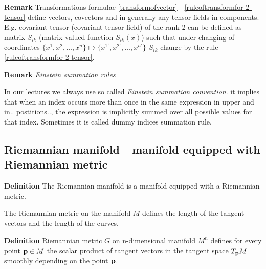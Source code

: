 \documentclass[12pt]{article}
\theoremstyle{theorem}
\numberwithin{equation}{section}
\begin{document}
{\bf Remark} Transformations formulae \eqref{transformofvector}---\eqref{ruleoftransformfor 2-tensor}  define
vectors, covectors and in generally any tensor fields in components. E.g. covariant tensor (covariant tensor field)
of the rank 2 can be defined as matrix $S_{ik}$ (matrix valued function $S_{ik}(x)$) such that
under changing of coordinates $\{x^1,x^2,\dots,x^n\}\mapsto \{x^{1'},x^{2'},\dots,x^{n'}\}$
 $S_{ik}$ change by the rule \eqref{ruleoftransformfor 2-tensor}.


{\bf Remark} {\it Einstein summation rules}


 In our lectures we always use so called {\it Einstein summation convention}.
 it  implies that when an index occurs more than once in the same expression in upper and in.. postitions..,
 the expression is implicitly summed over all possible values for that index.
  Sometimes it is called dummy indices summation rule.


    \subsection {Riemannian manifold---manifold equipped with Riemannian metric}

{\bf Definition} The Riemannian manifold is a manifold equipped with a Riemannian metric.




  The Riemannian metric on the manifold $M$ defines the
  length of the tangent vectors and the length of the curves.

{\bf Definition}
  Riemannian metric $G$ on n-dimensional manifold $M^n$
  defines for every point ${\bf p}\in M$ the scalar product
  of tangent vectors in the tangent space $T_{\bf p} M$
  smoothly depending on the point ${\bf p} $.
\end{document}
